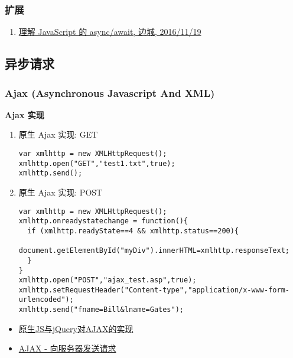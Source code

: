 \subsubsection{扩展}\label{ux6269ux5c55-1}

\begin{enumerate}
\def\labelenumi{\arabic{enumi}.}
\tightlist
\item
  \href{https://segmentfault.com/a/1190000007535316}{理解 JavaScript 的
  async/await, 边城, 2016/11/19}
\end{enumerate}

\subsection{异步请求}\label{ux5f02ux6b65ux8bf7ux6c42}

\subsubsection{Ajax (Asynchronous Javascript And
XML)}\label{ajax-asynchronous-javascript-and-xml}

\textbf{Ajax 实现}

\begin{enumerate}
\def\labelenumi{\arabic{enumi}.}
\item
  原生 Ajax 实现: GET

\begin{lstlisting}
var xmlhttp = new XMLHttpRequest();
xmlhttp.open("GET","test1.txt",true);
xmlhttp.send();
\end{lstlisting}
\item
  原生 Ajax 实现: POST

\begin{lstlisting}
var xmlhttp = new XMLHttpRequest();
xmlhttp.onreadystatechange = function(){
  if (xmlhttp.readyState==4 && xmlhttp.status==200){
    document.getElementById("myDiv").innerHTML=xmlhttp.responseText;
  }
}
xmlhttp.open("POST","ajax_test.asp",true);
xmlhttp.setRequestHeader("Content-type","application/x-www-form-urlencoded");
xmlhttp.send("fname=Bill&lname=Gates");
\end{lstlisting}
\end{enumerate}

\begin{itemize}
\tightlist
\item
  \href{http://segmentfault.com/a/1190000003096293}{原生JS与jQuery对AJAX的实现}
\item
  \href{http://www.w3school.com.cn/ajax/ajax_xmlhttprequest_send.asp}{AJAX
  - 向服务器发送请求}
\end{itemize}

